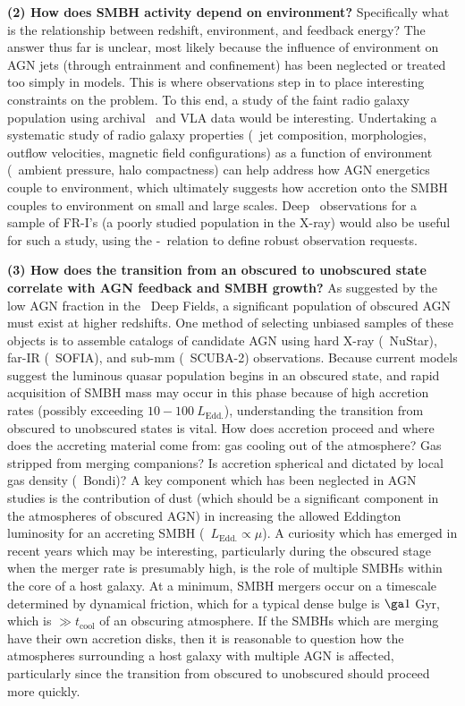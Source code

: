 \documentclass[12pt]{article}
\begin{document}
{\bf{(2) How does SMBH activity depend on environment?}} Specifically
what is the relationship between redshift, environment, and feedback
energy? The answer thus far is unclear, most likely because the
influence of environment on AGN jets (through entrainment and
confinement) has been neglected or treated too simply in models. This
is where observations step in to place interesting constraints on the
problem. To this end, a study of the faint radio galaxy population
using archival \chandra\ and VLA data would be
interesting. Undertaking a systematic study of radio galaxy properties
(\ie\ jet composition, morphologies, outflow velocities, magnetic
field configurations) as a function of environment (\ie\ ambient
pressure, halo compactness) can help address how AGN energetics couple
to environment, which ultimately suggests how accretion onto the SMBH
couples to environment on small and large scales. Deep \chandra\
observations for a sample of FR-I's (a poorly studied population in
the X-ray) would also be useful for such a study, using the
\pjet-\lrad\ relation to define robust observation requests.

{\bf{(3) How does the transition from an obscured to unobscured state
correlate with AGN feedback and SMBH growth?}} As suggested by the low
AGN fraction in the \chandra\ Deep Fields, a significant population of
obscured AGN must exist at higher redshifts. One method of selecting
unbiased samples of these objects is to assemble catalogs of candidate
AGN using hard X-ray (\ie\ NuStar), far-IR (\ie\ SOFIA), and sub-mm
(\ie\ SCUBA-2) observations. Because current models suggest the
luminous quasar population begins in an obscured state, and rapid
acquisition of SMBH mass may occur in this phase because of high
accretion rates (possibly exceeding $10-100~L_{\mathrm{Edd.}}$),
understanding the transition from obscured to unobscured states is
vital. How does accretion proceed and where does the accreting
material come from: gas cooling out of the atmosphere? Gas stripped
from merging companions? Is accretion spherical and dictated by local
gas density (\eg\ Bondi)?  A key component which has been neglected in
AGN studies is the contribution of dust (which should be a significant
component in the atmospheres of obscured AGN) in increasing the
allowed Eddington luminosity for an accreting SMBH (\ie\
$L_{\mathrm{Edd.}} \propto \mu$). A curiosity which has emerged in
recent years which may be interesting, particularly during the
obscured stage when the merger rate is presumably high, is the role of
multiple SMBHs within the core of a host galaxy. At a minimum, SMBH
mergers occur on a timescale determined by dynamical friction, which
for a typical dense bulge is $\ga 1$ Gyr, which is $\gg
t_{\mathrm{cool}}$ of an obscuring atmosphere. If the SMBHs which are
merging have their own accretion disks, then it is reasonable to
question how the atmospheres surrounding a host galaxy with multiple
AGN is affected, particularly since the transition from obscured to
unobscured should proceed more quickly.
\end{document}
